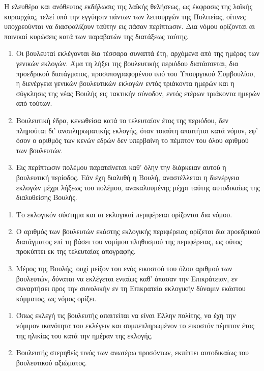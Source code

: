 \documentclass[twoside, a4paper, 10pt]{article}
\begin{document}
\begin{multicols}{2}
\begin{enumerate}
\begin{BigQuote}
Η ελευθέρα και ανόθευτος εκδήλωσις της λαϊκής θελήσεως, ως έκφρασις της λαϊκής κυριαρχίας, τελεί υπό την εγγύησιν πάντων των λειτουργών της Πολιτείας, οίτινες υποχρεούνται να διασφαλίζουν ταύτην εις πάσαν περίπτωσιν. Δια νόμου ορίζονται αι ποινικαί κυρώσεις κατά των παραβατών της διατάξεως ταύτης.

\begin{enumerate}
  \item[1.] Οι βουλευταί εκλέγονται δια τέσσαρα συναπτά έτη, αρχόμενα από της ημέρας των γενικών εκλογών. Άμα τη λήξει της βουλευτικής περιόδου διατάσσεται, δια προεδρικού διατάγματος, προσυπογραφομένου υπό του Υπουργικού Συμβουλίου, η διενέργεια γενικών βουλευτικών εκλογών εντός τριάκοντα ημερών και η σύγκλησις της νέας Βουλής εις τακτικήν σύνοδον, εντός ετέρων τριάκοντα ημερών από τούτων.
  \item[2.] Βουλευτική έδρα, κενωθείσα κατά το τελευταίον έτος της περιόδου, δεν πληρούται δι' αναπληρωματικής εκλογής, όταν τοιαύτη απαιτήται κατά νόμον, εφ' όσον ο αριθμός των κενών εδρών δεν υπερβαίνη το πέμπτον του όλου αριθμού των βουλευτών.
  \item[3.] Εις περίπτωσιν πολέμου παρατείνεται καθ' όλην την διάρκειαν αυτού η βουλευτική περίοδος. Εάν έχη διαλυθή η Βουλή, αναστέλλεται η διενέργεια εκλογών μέχρι λήξεως του πολέμου, ανακαλουμένης μέχρι ταύτης αυτοδικαίως της διαλυθείσης Βουλής.
\end{enumerate}

\begin{enumerate}
  \item[1.] Το εκλογικόν σύστημα και αι εκλογικαί περιφέρειαι ορίζονται δια νόμου.
  \item[2.] Ο αριθμός των βουλευτών εκάστης εκλογικής περιφέρειας ορίζεται δια προεδρικού διατάγματος επί τη βάσει του νομίμου πληθυσμού της περιφέρειας, ως ούτος προκύπτει εκ της τελευταίας απογραφής.
  \item[3.] Μέρος της Βουλής, ουχί μείζον του ενός εικοστού του όλου αριθμού των βουλευτών, δύναται να εκλέγεται ενιαίως καθ' άπασαν την Επικράτειαν, εν συναρτήσει προς την συνολικήν εν τη Επικρατεία εκλογικήν δύναμιν εκάστου κόμματος, ως νόμος ορίζει.
\end{enumerate}

\begin{enumerate}
  \item[1.] Όπως εκλεγή τις βουλευτής απαιτείται να είναι Έλλην πολίτης, να έχη την νόμιμον ικανότητα του εκλέγειν και συμπεπληρωμένον το εικοστόν πέμπτον έτος της ηλικίας του κατά την ημέραν της εκλογής.
  \item[2.] Βουλευτής στερηθείς τινός των ανωτέρω προσόντων, εκπίπτει αυτοδικαίως του βουλευτικού αξιώματος.
\end{enumerate}


\end{BigQuote}
\end{enumerate}
\end{multicols}
\end{document}
